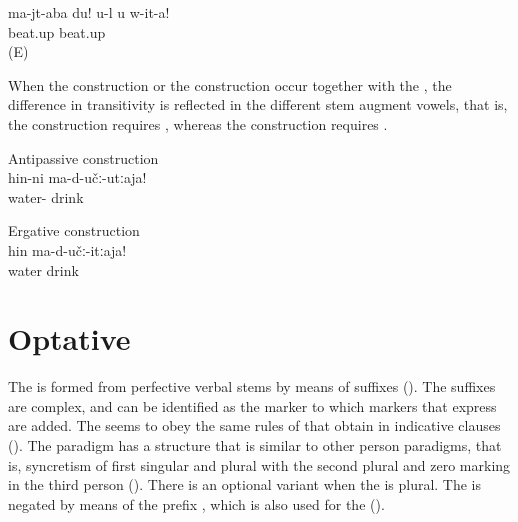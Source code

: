\begin{exe}
	\ex	\label{ex:‎Do not thrash me}
	\gll	ma-jt-aba	du!	u-l	u	w-it-a!\\
		beat.up				beat.up\\
	\glt	{} (E)
\end{exe}

When the  construction or the  construction occur together with the , the difference in transitivity is reflected in the different stem augment vowels, that is, the  construction requires  , whereas the  construction requires  .

\begin{exe}
	\ex
	\begin{xlist}
		\ex	\label{ex:Do not drink water (regularly)}
		Antipassive construction\\
		\gll	hin-ni	ma-d-učː-utːaja!\\
			water-	drink\\
		\glt	{}
	
		\ex	\label{Do not drink the water}
		Ergative construction\\
		\gll	hin	ma-d-učː-itːaja!\\
			water	drink\\
		\glt	{}
	\end{xlist}
\end{exe}



\section{Optative}\label{sec:optative}
\largerpage[-2]

The  is formed from perfective verbal stems by means of suffixes (). The suffixes are complex, and  can be identified as the  marker to which markers that express  are added. The  seems to obey the same rules of  that obtain in indicative clauses (). The paradigm has a structure that is similar to other person paradigms, that is, syncretism of first singular and plural with the second plural and zero marking in the third person (). There is an optional variant  when the  is plural. The  is negated by means of the prefix , which is also used for the  ().\pagebreak

